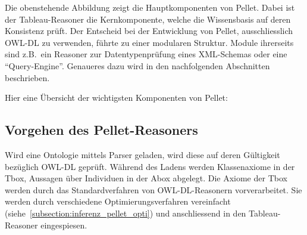 Die obenstehende Abbildung zeigt die Hauptkomponenten von Pellet. Dabei ist der Tableau-Reasoner die Kernkomponente, welche die Wissensbasis auf deren Konsistenz prüft. Der Entscheid bei der Entwicklung von Pellet, ausschliesslich OWL-DL zu verwenden, führte zu einer modularen Struktur. Module ihrerseits sind z.B.\ ein Reasoner zur Datentypenprüfung eines XML-Schemas oder eine ``Query-Engine''. Genaueres dazu wird in den nachfolgenden Abschnitten beschrieben.

Hier eine Übersicht der wichtigsten Komponenten von Pellet\cite[S. 4]{sirin:pellet05}:
\begin{table}[H]
\centering
{}\hfill
{}
\end{table}


\subsection{Vorgehen des Pellet-Reasoners}
\label{subsection:inferenz_pellet_vorgehen}
Wird eine Ontologie mittels Parser geladen, wird diese auf deren Gültigkeit bezüglich OWL-DL geprüft. Während des Ladens werden Klassenaxiome in der Tbox, Aussagen über Individuen in der Abox abgelegt. Die Axiome der Tbox werden durch das Standardverfahren von OWL-DL-Reasonern vorverarbeitet. Sie werden durch verschiedene Optimierungsverfahren vereinfacht (siehe~\ref{subsection:inferenz_pellet_opti}) und anschliessend in den Tableau-Reasoner eingespiesen.

